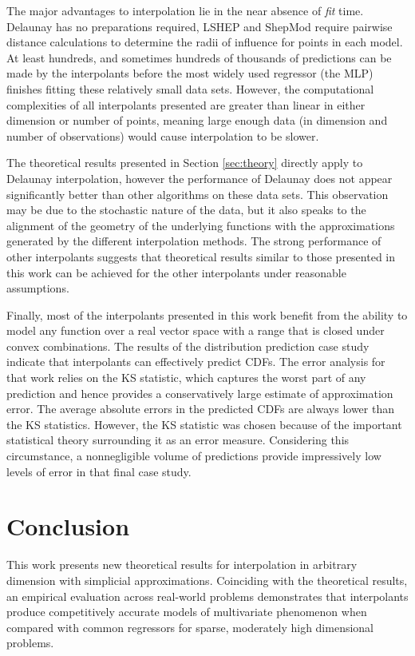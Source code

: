 \documentclass[smallextended,final]{svjour3}       %
\begin{document}
The major advantages to interpolation lie in the near absence of \textit{fit} time. Delaunay has no preparations required, LSHEP and ShepMod require pairwise distance calculations to determine the radii of influence for points in each model. At least hundreds, and sometimes hundreds of thousands of predictions can be made by the interpolants before the most widely used regressor (the MLP) finishes fitting these relatively small data sets. However, the computational complexities of all interpolants presented are greater than linear in either dimension or number of points, meaning large enough data (in dimension and number of observations) would cause interpolation to be slower.

The theoretical results presented in Section \ref{sec:theory} directly apply to Delaunay interpolation, however the performance of Delaunay does not appear significantly better than other algorithms on these data sets. This observation may be due to the stochastic nature of the data, but it also speaks to the alignment of the geometry of the underlying functions with the approximations generated by the different interpolation methods. The strong performance of other interpolants suggests that theoretical results similar to those presented in this work can be achieved for the other interpolants under reasonable assumptions.

Finally, most of the interpolants presented in this work benefit from the ability to model any function over a real vector space with a range that is closed under convex combinations. The results of the distribution prediction case study indicate that interpolants can effectively predict CDFs. The error analysis for that work relies on the KS statistic, which captures the worst part of any prediction and hence provides a conservatively large estimate of approximation error. The average absolute errors in the predicted CDFs are always lower than the KS statistics. However, the KS statistic was chosen because of the important statistical theory surrounding it as an error measure. Considering this circumstance, a nonnegligible volume of predictions provide impressively low levels of error in that final case study.


\section{Conclusion}
\label{sec:conclusion}

This work presents new theoretical results for interpolation in arbitrary dimension with simplicial approximations. Coinciding with the theoretical results, an empirical evaluation across real-world problems demonstrates that interpolants produce competitively accurate models of multivariate phenomenon when compared with common regressors for sparse, moderately high dimensional problems.
\end{document}

